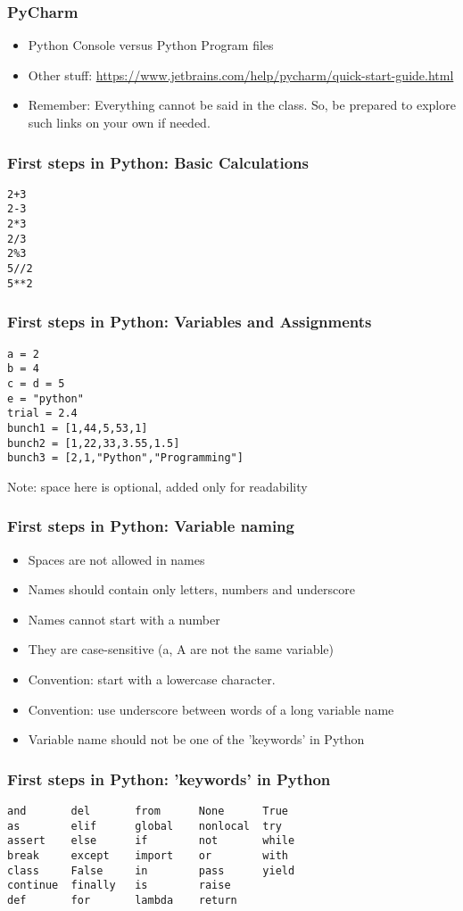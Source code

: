 \documentclass{beamer}
\begin{document}
\begin{frame}
\frametitle{PyCharm}
\begin{itemize}
\item Python Console versus Python Program files
\item Other stuff: \url{https://www.jetbrains.com/help/pycharm/quick-start-guide.html}
\item Remember: Everything cannot be said in the class. So, be prepared to explore such links on your own if needed. 
\end{itemize}
\end{frame}

\begin{frame}[fragile]
\frametitle{First steps in Python: Basic Calculations}
\begin{verbatim}
2+3
2-3
2*3
2/3
2%3
5//2
5**2
\end{verbatim}
\end{frame}

\begin{frame}[fragile]
\frametitle{First steps in Python: Variables and Assignments}
\begin{verbatim}
a = 2
b = 4
c = d = 5
e = "python"
trial = 2.4
bunch1 = [1,44,5,53,1]
bunch2 = [1,22,33,3.55,1.5]
bunch3 = [2,1,"Python","Programming"]
\end{verbatim}
Note: space here is optional, added only for readability
\end{frame}

\begin{frame}[fragile]
\frametitle{First steps in Python: Variable naming}
\begin{itemize}
\item Spaces are not allowed in names 
\item Names should contain only letters, numbers and underscore
\item Names cannot start with a number
\item They are case-sensitive (a, A are not the same variable)
\item Convention: start with a lowercase character.
\item Convention: use underscore between words of a long variable name
\item Variable name should not be one of the 'keywords' in Python
\end{itemize}
\end{frame}

\begin{frame}[fragile]
\frametitle{First steps in Python: 'keywords' in Python}
\begin{verbatim}
and       del       from      None      True
as        elif      global    nonlocal  try
assert    else      if        not       while
break     except    import    or        with
class     False     in        pass      yield
continue  finally   is        raise
def       for       lambda    return
\end{verbatim}
\end{frame}
\end{document}
